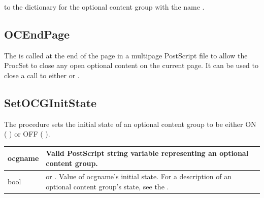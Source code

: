 \documentclass[letterpaper,12pt,english,openany,oneside]{sphinxmanual}
\begin{document}
\begin{sphinxVerbatim}[commandchars=\\\{\}]
  
  
\end{sphinxVerbatim}

to the dictionary for the optional content group with the name  .


\subsection{OCEndPage}
\label{\detokenize{pdfmark_OC_Interface:ocendpage}}
The  is called at the end of the page in a multi\sphinxhyphen{}page PostScript file to allow the ProcSet to close any open optional content on the current page. It can be used to close a call to either  or  .

\label{\detokenize{pdfmark_OC_Interface:syntax-4}}

\begin{sphinxVerbatim}[commandchars=\\\{\}]
\end{sphinxVerbatim}


\subsection{SetOCGInitState}
\label{\detokenize{pdfmark_OC_Interface:setocginitstate}}
The  procedure sets the initial state of an optional content group to be either ON ( ) or OFF ( ).

\label{\detokenize{pdfmark_OC_Interface:syntax-5}}

\begin{sphinxVerbatim}[commandchars=\\\{\}]
  
\end{sphinxVerbatim}
\label{\detokenize{pdfmark_OC_Interface:parameters-3}}


\begin{savenotes}\sphinxattablestart
\centering
{}\label{\detokenize{pdfmark_OC_Interface:section-3}}\nobreak
\begin{tabulary}{\linewidth}[t]{|T|T|}
\hline

ocgname
&
Valid PostScript string variable representing an optional content group.
\\
\hline
bool
&
 or  . Value of ocgname’s initial state. For a description of an optional content group’s state, see the  .
\\
\hline
\end{tabulary}
\par
\sphinxattableend\end{savenotes}
\end{document}
